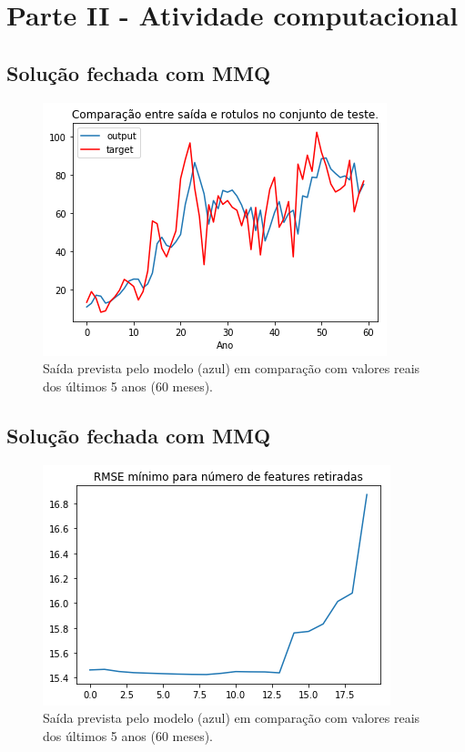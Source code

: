 \documentclass[a4paper, 12pt]{article}
\begin{document}
\newpage

\section*{Parte II - Atividade computacional}

\subsection*{Solução fechada com MMQ}

\begin{figure}[h!]
  \includegraphics{images/raw.png}
    \caption{Saída prevista pelo modelo (azul) em comparação com valores reais dos últimos 5 anos (60 meses).}
\end{figure}

\subsection*{Solução fechada com MMQ}

\begin{figure}[h!]
  \includegraphics{images/backward.png}
    \caption{Saída prevista pelo modelo (azul) em comparação com valores reais dos últimos 5 anos (60 meses).}
\end{figure}
\end{document}
